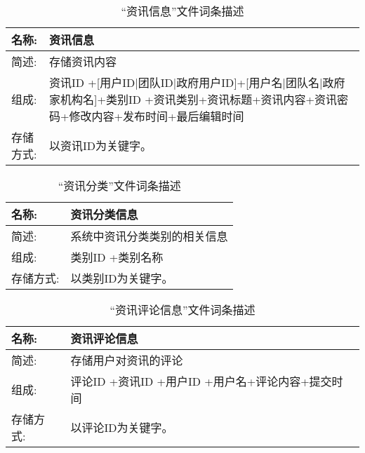\begin{table}[H]  
\caption{“资讯信息”文件词条描述}  
\begin{center}  
    \begin{tabular}{l p{10cm}} 
        \hline
        \quad 名称:  &  资讯信息 \\
        \hline
        \quad 简述:  & 存储资讯内容\\
        \hline
        \quad 组成:  & 资讯ID +[用户ID|团队ID|政府用户ID]+[用户名|团队名|政府家机构名]+类别ID +资讯类别+资讯标题+资讯内容+{资讯密码}+修改内容+发布时间+最后编辑时间 \\
        \hline
        \quad 存储方式:  & 以资讯ID为关键字。 \\
        \hline
    \end{tabular}
    \label{tab1}
\end{center}
\end{table}

\begin{table}[H]  
\caption{“资讯分类”文件词条描述}  
\begin{center}  
    \begin{tabular}{l p{10cm}} 
        \hline
        \quad 名称:  &  资讯分类信息 \\
        \hline
        \quad 简述:  & 系统中资讯分类类别的相关信息 \\
        \hline
        \quad 组成:  & 类别ID +类别名称 \\
        \hline
        \quad 存储方式:  & 以类别ID为关键字。 \\
        \hline
    \end{tabular}
    \label{tab1}
\end{center}
\end{table}

\begin{table}[H]  
\caption{“资讯评论信息”文件词条描述}  
\begin{center}  
    \begin{tabular}{l p{10cm}} 
        \hline
        \quad 名称:  &  资讯评论信息 \\
        \hline
        \quad 简述:  & 存储用户对资讯的评论 \\
        \hline
        \quad 组成:  & 评论ID +资讯ID +用户ID +用户名+评论内容+提交时间 \\
        \hline
        \quad 存储方式:  & 以评论ID为关键字。 \\
        \hline
    \end{tabular}
    \label{tab1}
\end{center}
\end{table}

